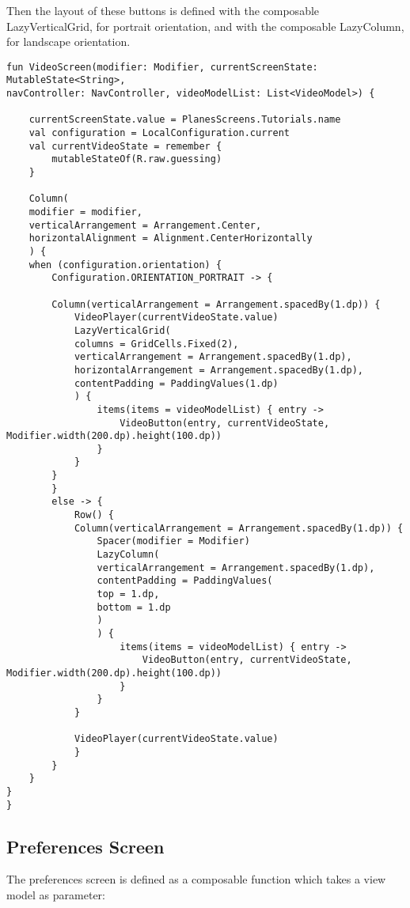 Then the layout of these buttons is defined with the composable LazyVerticalGrid, for portrait orientation, and with the composable LazyColumn, for landscape orientation.

\begin{lstlisting}
fun VideoScreen(modifier: Modifier, currentScreenState: MutableState<String>,
navController: NavController, videoModelList: List<VideoModel>) {
	
	currentScreenState.value = PlanesScreens.Tutorials.name
	val configuration = LocalConfiguration.current
	val currentVideoState = remember {
		mutableStateOf(R.raw.guessing)
	}
	
	Column(
	modifier = modifier,
	verticalArrangement = Arrangement.Center,
	horizontalAlignment = Alignment.CenterHorizontally
	) {
	when (configuration.orientation) {
		Configuration.ORIENTATION_PORTRAIT -> {
			
		Column(verticalArrangement = Arrangement.spacedBy(1.dp)) {
			VideoPlayer(currentVideoState.value)
			LazyVerticalGrid(
			columns = GridCells.Fixed(2),
			verticalArrangement = Arrangement.spacedBy(1.dp),
			horizontalArrangement = Arrangement.spacedBy(1.dp),
			contentPadding = PaddingValues(1.dp)
			) {
				items(items = videoModelList) { entry ->
					VideoButton(entry, currentVideoState, Modifier.width(200.dp).height(100.dp))
				}
			}
		}
		}
		else -> {
			Row() {
			Column(verticalArrangement = Arrangement.spacedBy(1.dp)) {
				Spacer(modifier = Modifier)
				LazyColumn(
				verticalArrangement = Arrangement.spacedBy(1.dp),
				contentPadding = PaddingValues(
				top = 1.dp,
				bottom = 1.dp
				)
				) {
					items(items = videoModelList) { entry ->
						VideoButton(entry, currentVideoState, Modifier.width(200.dp).height(100.dp))
					}
				}
			}
			
			VideoPlayer(currentVideoState.value)
			}
		}
	}
}
}
\end{lstlisting}

\subsection{Preferences Screen}

The preferences screen is defined as a composable function which takes a view model as parameter:

